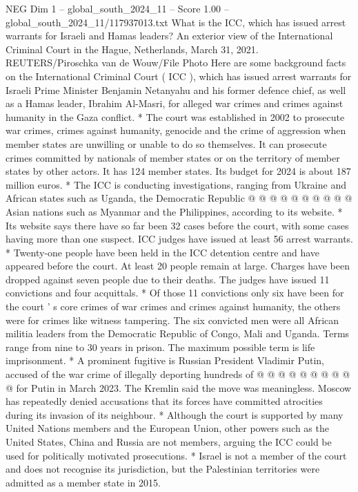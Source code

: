 \begin{textsample}{NEG Dim 1 – global\_south\_2024\_11 – Score 1.00 – global\_south\_2024\_11/117937013.txt}  \label{ex:f1_neg_204}
What is the ICC, which has issued arrest warrants for Israeli and Hamas leaders?
An exterior view of the International Criminal Court in the Hague, Netherlands, March 31, 2021.
REUTERS/Piroschka van de Wouw/File Photo Here are some background facts on the International Criminal Court ( ICC ), which has issued arrest warrants for Israeli Prime Minister Benjamin Netanyahu and his former defence chief, as well as a Hamas leader, Ibrahim Al-Masri, for alleged war crimes and crimes against humanity in the Gaza conflict. * The court was established in 2002 to prosecute war crimes, crimes against humanity, genocide and the crime of aggression when member states are unwilling or unable to do so themselves.
It can prosecute crimes committed by nationals of member states or on the territory of member states by other actors.
It has 124 member states.
Its budget for 2024 is about 187 million euros. * The ICC is conducting investigations, ranging from Ukraine and African states such as Uganda, the Democratic Republic @ @ @ @ @ @ @ @ @ @ Asian nations such as Myanmar and the Philippines, according to its website. * Its website says there have so far been 32 cases before the court, with some cases having more than one suspect.
ICC judges have issued at least 56 arrest warrants. * Twenty-one people have been held in the ICC detention centre and have appeared before the court.
At least 20 people remain at large.
Charges have been dropped against seven people due to their deaths.
The judges have issued 11 convictions and four acquittals. * Of those 11 convictions only six have been for the court ' s core crimes of war crimes and crimes against humanity, the others were for crimes like witness tampering.
The six convicted men were all African militia leaders from the Democratic Republic of Congo, Mali and Uganda.
Terms range from nine to 30 years in prison.
The maximum possible term is life imprisonment. * A prominent fugitive is Russian President Vladimir Putin, accused of the war crime of illegally deporting hundreds of @ @ @ @ @ @ @ @ @ @ for Putin in March 2023.
The Kremlin said the move was meaningless.
Moscow has repeatedly denied accusations that its forces have committed atrocities during its invasion of its neighbour. * Although the court is supported by many United Nations members and the European Union, other powers such as the United States, China and Russia are not members, arguing the ICC could be used for politically motivated prosecutions. * Israel is not a member of the court and does not recognise its jurisdiction, but the Palestinian territories were admitted as a member state in 2015.

\end{textsample}
